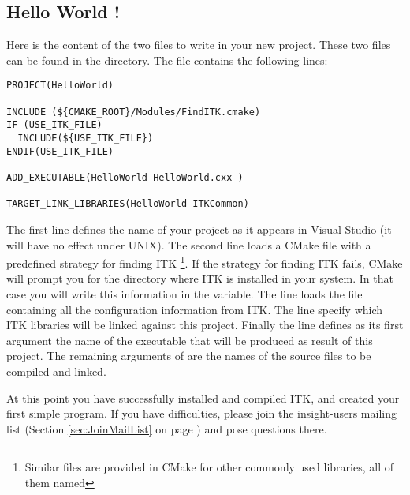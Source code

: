 \subsection{Hello World !}
\label{sec:HelloWorldITK}


Here is the content of the two files to write in your new project. These two
files can be found in the  directory. The
 file contains the following lines:

\begin{verbatim}
PROJECT(HelloWorld)

INCLUDE (${CMAKE_ROOT}/Modules/FindITK.cmake)
IF (USE_ITK_FILE)
  INCLUDE(${USE_ITK_FILE})
ENDIF(USE_ITK_FILE)

ADD_EXECUTABLE(HelloWorld HelloWorld.cxx )

TARGET_LINK_LIBRARIES(HelloWorld ITKCommon)
\end{verbatim}

The first line defines the name of your project as it appears in Visual
Studio (it will have no effect under UNIX). The second line loads a CMake
file with a predefined strategy for finding ITK \footnote{Similar files are
provided in CMake for other commonly used libraries, all of them named
}. If the strategy for finding ITK fails, CMake will prompt
you for the directory where ITK is installed in your system. In that case you
will write this information in the  variable. The line  loads the  file containing
all the configuration information from ITK. The  line
specify which ITK libraries will be linked against this project. Finally the
line
 defines as its first argument the name of the executable
that will be produced as result of this project. The remaining arguments of
 are the names of the source files to be compiled and linked.



At this point you have successfully installed and compiled ITK, and created
your first simple program. If you have difficulties, please join the
insight-users mailing list (Section \ref{sec:JoinMailList} on page
\pageref{sec:JoinMailList}) and pose questions there.
